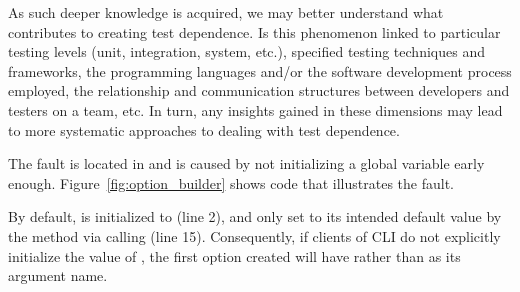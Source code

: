







As such deeper knowledge is acquired, we may better understand
what contributes to creating test dependence. Is this
  phenomenon linked to particular testing levels (unit, integration,
  system, etc.), specified testing techniques and frameworks, the programming
languages and/or the software development process employed, the relationship
and communication structures between developers and testers on a team, etc.  In turn,
any insights gained in these dimensions may lead to more systematic
approaches to dealing with test dependence.

The fault is located in 
 and is caused by not initializing a global
variable early enough.
Figure~\ref{fig:option_builder} shows code that
illustrates the fault. 

%
By default,
 is initialized to  (line 2), and only set to
its intended default value  by the  method
via calling  (line 15). 
Consequently, if clients of CLI do not explicitly initialize the value of
, the first option created will have  rather
than  as its argument name.

